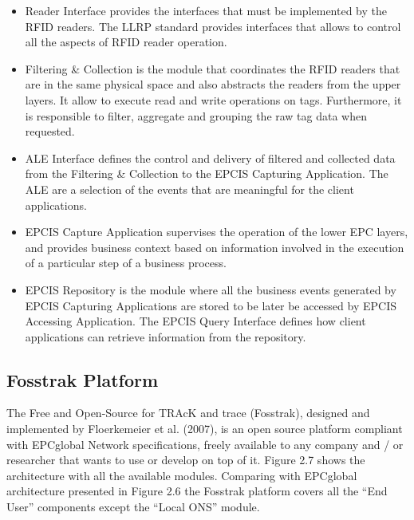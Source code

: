 \begin{itemize}
  \item Reader Interface provides the interfaces that must be implemented by the \gls{RFID} readers.
  The \gls{LLRP} standard provides interfaces that allows to control all the aspects of \gls{RFID}
  reader operation.
  \item Filtering \& Collection is the module that coordinates the \gls{RFID} readers that are in the
  same physical space and also abstracts the readers from the upper layers. It allow to execute read
  and write operations on tags. Furthermore, it is responsible to filter, aggregate and grouping the
  raw tag data when requested.
  \item \gls{ALE} Interface defines the control and delivery of filtered and collected data from the
  Filtering \&  Collection to the \gls{EPCIS} Capturing Application. The \gls{ALE} are a selection of
  the events that are meaningful for the client applications.
  \item EPCIS Capture Application supervises the operation of the lower EPC layers, and provides
  business context based on information involved in the execution of a particular step of a business
  process.
  \item EPCIS Repository is the module where all the business events generated by EPCIS Capturing
  Applications are stored to be later be accessed by EPCIS Accessing Application. The EPCIS Query
  Interface defines how client applications can retrieve information from the repository.
\end{itemize}

\subsection{Fosstrak Platform}
\label{sub:fosstrak}
The Free and Open-Source for TRAcK and trace (Fosstrak), designed and implemented by Floerkemeier et
al. (2007), is an open source platform compliant with EPCglobal Network specifications, freely available
to any company and / or researcher that wants to use or develop on top of it. Figure 2.7 shows the architecture
with all the available modules. Comparing with EPCglobal architecture presented in Figure 2.6 the
Fosstrak platform covers all the “End User” components except the “Local ONS” module.

